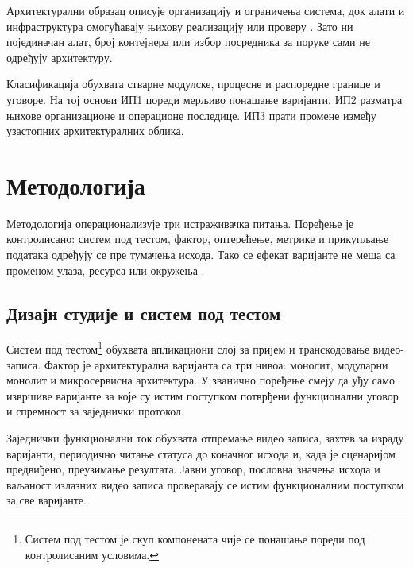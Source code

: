 \documentclass[12pt,oneside]{memoir}
\begin{document}
Архитекту\-рални образац описује организацију и ограничења система, док алати и
инфра\-структура омогућавају њихову реализацију или проверу
\cite{bass2012software}. Зато ни појединачан алат, број контејнера или избор
посредника за поруке сами не одређују архитектуру.

Класификација обухвата стварне модулске, процесне и распоредне границе и
уговоре. На тој основи ИП1 пореди мерљиво понашање варијанти. ИП2 разматра
њихове организационе и операционе последице. ИП3 прати промене између
узастопних архитектуралних облика.
\endgroup

\chapter{Методологија}
\label{chp:metodologija}
\begingroup
\setlength{\emergencystretch}{3em}

Методологија операционализује три истраживачка питања. Поређење је
контролисано: систем под тестом, фактор, оптерећење, метрике и прикупљање
података одређују се пре тумачења исхода. Тако се ефекат варијанте не меша са
променом улаза, ресурса или окружења
\cite{jain1991art,kounev2020benchmarking}.

\section{Дизајн студије и систем под тестом}

Систем под тестом\footnote{Систем под тестом је скуп компонената чије се
	понашање пореди под контролисаним условима.} обухвата апликациони слој за
пријем и транскодовање видео-записа. Фактор је архитектурална варијанта са три
нивоа: монолит, модуларни монолит и микросервисна архитектура. У званично
поређење смеју да уђу само извршиве варијанте за које су истим поступком
потврђени функционални уговор и спремност за заједнички протокол.


Заједнички функционални ток обухвата отпремање видео записа, захтев за израду
варијанти, периодично читање статуса до коначног исхода и, када је сценаријом
предвиђено, преузимање резултата. Јавни уговор, пословна значења исхода и
ваљаност излазних видео записа проверавају се истим функционалним поступком за
све варијанте.
\end{document}
